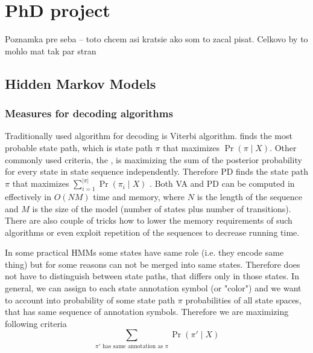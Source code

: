 \chapter{PhD project}
Poznamka pre seba -- toto chcem asi kratsie ako som to zacal pisat. Celkovo by
to mohlo mat tak par stran

\section{Hidden Markov Models}

\subsection{Measures for decoding algorithms}



Traditionally used algorithm for decoding  is Viterbi 
algorithm.  finds the most probable state path, which is
state path $\pi$ that maximizes $\Pr\left(\pi \mid X\right)$. Other commonly
used criteria, the , is maximizing the sum of the posterior
probability for every state in state sequence independently. Therefore PD finds
the state path $\pi$ that maximizes $\sum_{i=1}^{|\pi|} \Pr\left(\pi_i \mid
X\right)$ . Both VA and PD can be
computed in effectively in $O(NM)$ time and memory, where $N$ is the
length of the sequence and $M$ is the size of the model (number of states plus
number of transitions). There are also couple of tricks how to lower the memory
requirements of such algorithms or even exploit repetition of the sequences to
decrease running time.

In some practical HMMs some states have same role (i.e. they encode same thing)
but for some reasons can not be merged into same states. Therefore does not have
to distinguish between state paths, that differs only in those states. In
general, we can assign to each state annotation symbol (or "color") and we want
to account into probability of some state path $\pi$ probabilities of all state
spaces, that has same sequence of annotation symbols. Therefore we are
maximizing following criteria
\[\sum_{\pi'\textrm{ has same annotation as }\pi}\Pr\left( \pi' \mid X \right)\]

